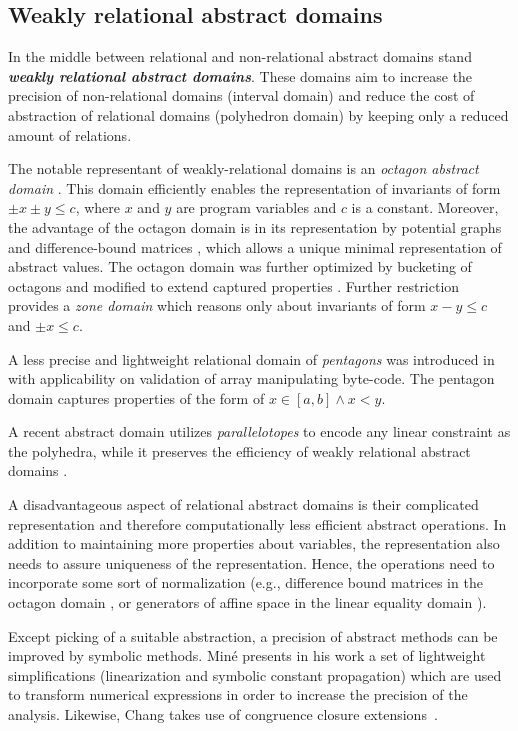 \subsection{Weakly relational abstract domains}

In the middle between relational and non-relational abstract domains stand
\textbf{\emph{weakly relational abstract domains}}. These domains aim to
increase the precision of non-relational domains (interval domain) and reduce
the cost of abstraction of relational domains (polyhedron domain) by keeping
only a reduced amount of relations.

The notable representant of weakly-relational domains is an \emph{octagon
abstract domain} \cite{Mine2006}. This domain efficiently enables the representation
of invariants of form $\pm x \pm y \leq c$, where $x$ and $y$ are program
variables and $c$ is a constant.  Moreover, the advantage of the octagon domain
is in its representation by potential graphs and difference-bound matrices
\cite{Larsen1997}, which allows a unique minimal representation of abstract
values. The octagon domain was further optimized by bucketing of octagons
\cite{Blanchet2003, Venet2004} and modified to extend captured properties
\cite{Claris2004, Mine2004}. Further restriction provides a \emph{zone domain}
\cite{Mine2001} which reasons only about invariants of form $x - y \leq c$ and
$\pm x \leq c$.

A less precise and lightweight relational domain of \emph{pentagons} was introduced in~\cite{Logozzo2010} with applicability on validation of array manipulating
byte-code. The pentagon domain captures properties of the form of $x \in [a,b]
\wedge x < y$.

A recent abstract domain utilizes \emph{parallelotopes} to encode any linear
constraint as the polyhedra, while it preserves the efficiency of weakly
relational abstract domains \cite{Amato2017}.

A disadvantageous aspect of relational abstract domains is their complicated
representation and therefore computationally less efficient abstract
operations. In addition to maintaining more properties about variables, the
representation also needs to assure uniqueness of the representation. Hence,
the operations need to incorporate some sort of normalization (e.g., difference
bound matrices in the octagon domain \cite{Mine2006}, or generators of affine
space in the linear equality domain \cite{Karr1976}).

Except picking of a suitable abstraction, a precision of abstract methods can
be improved by symbolic methods. Miné presents in his work \cite{Mine2006b} a
set of lightweight simplifications (linearization and symbolic constant
propagation) which are used to transform numerical expressions in order to
increase the precision of the analysis. Likewise, Chang takes use of congruence
closure extensions~\cite{Chang2005}.


